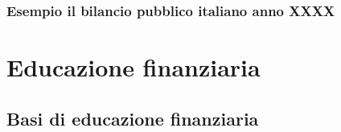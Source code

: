 \documentclass[letterpaper,10pt,italian]{jupyterBook}
\begin{document}
\section{Esempio \sphinxhyphen{} il bilancio pubblico italiano \sphinxhyphen{} anno XXXX}
\label{\detokenize{ch/public:esempio-il-bilancio-pubblico-italiano-anno-xxxx}}

\section{}
\label{\detokenize{ch/public:id2}}
\sphinxstepscope


\part{Educazione finanziaria}

\sphinxstepscope


\chapter{Basi di educazione finanziaria}
\label{\detokenize{ch/fin-edu:basi-di-educazione-finanziaria}}\label{\detokenize{ch/fin-edu:economics-hs-fin-edu}}\label{\detokenize{ch/fin-edu::doc}}






\renewcommand{\indexname}{Indice}
\printindex
\end{document}
